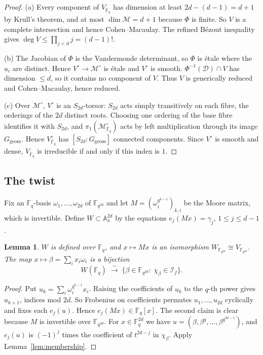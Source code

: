 \documentclass[11pt,a4paper]{article}
\newtheorem{lemma}[theorem]{Lemma}
\theoremstyle{definition}
\theoremstyle{remark}
\newcommand{\Fq}{\mathbb{F}_q}
\newcommand{\Fqbar}{\overline{\mathbb{F}}_q}
\newcommand{\A}{\mathbb{A}}
\newcommand{\Ggeom}{G_{\mathrm{geom}}}
\newcommand{\cI}{\mathcal{I}}
\newcommand{\cM}{\mathcal{M}}
\begin{document}
\begin{proof}
(a) Every component of $V_{\Fqbar}$ has dimension at least $2d-(d-1)=d+1$ by Krull's theorem,
and at most $\dim\cM=d+1$ because $\Phi$ is finite. So $V$ is a complete intersection
and hence Cohen--Macaulay. The refined Bézout inequality \cite[Example~8.4.6]{Fulton1998}
gives $\deg V\le\prod_{j<d}j=(d-1)!$.

(b) The Jacobian of $\Phi$ is the Vandermonde determinant, so $\Phi$ is \'etale where the
$u_i$ are distinct. Hence $V^\circ\to\cM^\circ$ is \'etale and $V^\circ$ is smooth.
$\Phi^{-1}(\mathcal D)\cap V$ has dimension $\le d$, so it contains no component of $V$.
Thus $V$ is generically reduced and Cohen--Macaulay, hence reduced.

(c) Over $\cM^\circ$, $V^\circ$ is an $S_{2d}$-torsor: $S_{2d}$ acts simply transitively on
each fibre, the orderings of the $2d$ distinct roots. Choosing one ordering of the base fibre
identifies it with $S_{2d}$, and $\pi_1(\cM^\circ_{\Fqbar})$ acts by left multiplication through
its image $\Ggeom$. Hence $V^\circ_{\Fqbar}$ has $[S_{2d}:\Ggeom]$ connected components. Since
$V^\circ$ is smooth and dense, $V_{\Fqbar}$ is irreducible if and only if this index is $1$.
\end{proof}

\subsection{The twist}
Fix an $\Fq$-basis $\omega_1,\dots,\omega_{2d}$ of $\mathbb{F}_{q^{2d}}$ and let
$M=(\omega_i^{q^{k-1}})_{k,i}$ be the Moore matrix, which is invertible. Define
$W\subset\A^{2d}_x$ by the equations $e_j(Mx)=\gamma_j$, $1\le j\le d-1$.

\begin{lemma}\label{lem:W}
$W$ is defined over $\Fq$, and $x\mapsto Mx$ is an isomorphism $W_{\mathbb{F}_{q^{2d}}}\cong V_{\mathbb{F}_{q^{2d}}}$.
The map $x\mapsto\beta=\sum_ix_i\omega_i$ is a bijection
\[
 W(\Fq)\;\xrightarrow{\ \sim\ }\;\{\beta\in\mathbb{F}_{q^{2d}}:\ \chi_\beta\in\cI_f\}.
\]
\end{lemma}

\begin{proof}
Put $u_k=\sum_i\omega_i^{q^{k-1}}x_i$. Raising the coefficients of $u_k$ to the $q$-th power
gives $u_{k+1}$, indices mod $2d$. So Frobenius on coefficients permutes $u_1,\dots,u_{2d}$
cyclically and fixes each $e_j(u)$. Hence $e_j(Mx)\in\Fq[x]$. The second claim is clear because
$M$ is invertible over $\mathbb{F}_{q^{2d}}$. For $x\in\Fq^{2d}$ we have
$u=(\beta,\beta^q,\dots,\beta^{q^{2d-1}})$, and $e_j(u)$ is $(-1)^j$ times the coefficient of
$t^{2d-j}$ in $\chi_\beta$. Apply Lemma~\ref{lem:membership}.
\end{proof}
\end{document}

